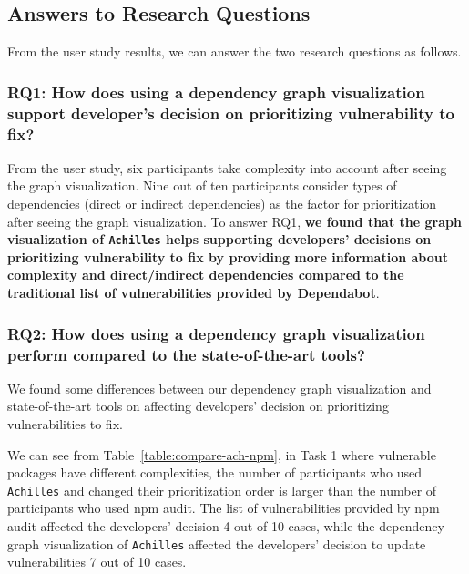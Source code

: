 \documentclass[conference]{IEEEtran}
\begin{document}
	
	\subsection{Answers to Research Questions}
	From the user study results, we can answer the two research questions as follows.
	
	\subsubsection{RQ1: How does using a dependency graph visualization support developer’s decision on prioritizing vulnerability to fix?}
	From the user study, six participants take complexity into account after seeing the graph visualization. Nine out of ten participants consider types of dependencies (direct or indirect dependencies) as the factor for prioritization after seeing the graph visualization.
	To answer RQ1, \textbf{we found that the graph visualization of \texttt{Achilles} helps supporting developers' decisions on prioritizing vulnerability to fix by providing more information about complexity and direct/indirect dependencies compared to the traditional list of vulnerabilities provided by Dependabot}.
	
	\subsubsection{RQ2: How does using a dependency graph visualization perform compared to the state-of-the-art tools?}
	We found some differences between our dependency graph visualization and state-of-the-art tools on affecting developers' decision on prioritizing vulnerabilities to fix. 
	
	We can see from Table~\ref{table:compare-ach-npm}, in Task 1 where vulnerable packages have different complexities, the number of participants who used \texttt{Achilles} and changed their prioritization order is larger than the number of participants who used npm audit. The list of vulnerabilities provided by npm audit affected the developers' decision 4 out of 10 cases, while the dependency graph visualization of \texttt{Achilles} affected the developers' decision to update vulnerabilities 7 out of 10 cases. %
	
\end{document}
